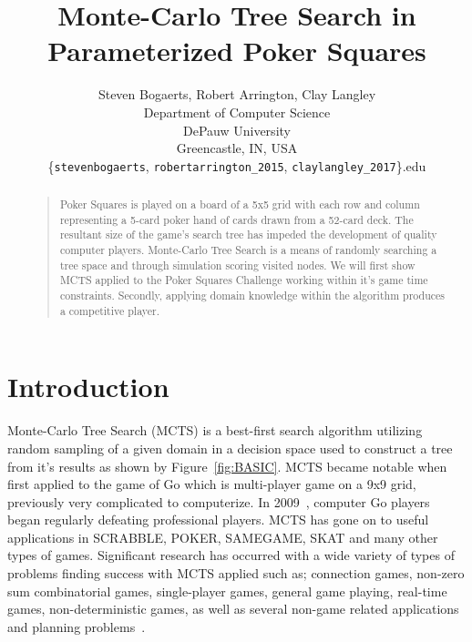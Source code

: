 \documentclass[letterpaper]{article}
\begin{document}
%
\title{Monte-Carlo Tree Search in Parameterized Poker Squares}    %
\author{Steven Bogaerts, Robert Arrington, Clay Langley\\
Department of Computer Science\\
DePauw University\\
Greencastle, IN, USA\\
\{{\tt stevenbogaerts}, {\tt robertarrington\_2015}, {\tt claylangley\_2017}\}{\tt@depauw.edu}
}
\maketitle
\begin{abstract}
\begin{quote}
Poker Squares is played on a board of a 5x5 grid with each row and column representing a 5-card poker hand of cards drawn from a 52-card deck. The resultant size of the game's search tree has impeded the development of quality computer players. Monte-Carlo Tree Search is a means of randomly searching a tree space and through simulation scoring visited nodes. We will first show MCTS applied to the Poker Squares Challenge working within it's game time constraints. Secondly, applying domain knowledge within the algorithm produces a competitive player.
\end{quote}
\end{abstract}

\section{Introduction}
Monte-Carlo Tree Search (MCTS) is a best-first search algorithm utilizing random sampling of a given domain in a decision space used to construct a tree from it's results as shown by Figure~\ref{fig:BASIC}. MCTS became notable when first applied to the game of Go which is multi-player game on a 9x9 grid, previously very complicated to computerize. In 2009~\cite{chaslot2008monte}, computer Go players began regularly defeating professional players. MCTS has gone on to useful applications in SCRABBLE, POKER, SAMEGAME, SKAT and many other types of games. Significant research has occurred with a wide variety of types of problems finding success with MCTS applied such as; connection games, non-zero sum combinatorial games, single-player games, general game playing, real-time games, non-deterministic games, as well as several non-game related applications and planning problems~\cite{browne2010monte}.
\end{document}
